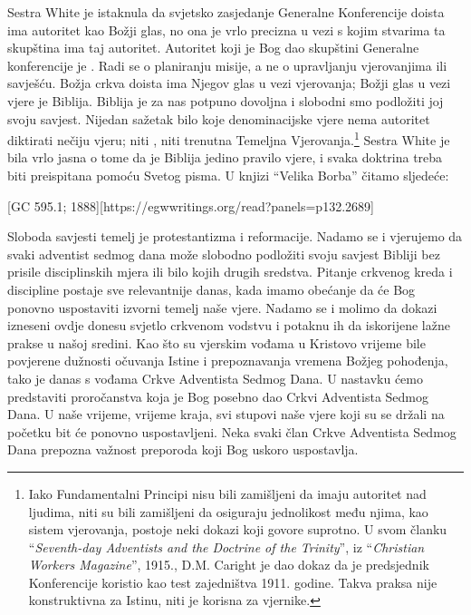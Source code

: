 Sestra White je istaknula da svjetsko zasjedanje Generalne Konferencije doista ima autoritet kao Božji glas, no ona je vrlo precizna u vezi s kojim stvarima ta skupština ima taj autoritet. Autoritet koji je Bog dao skupštini Generalne konferencije je . Radi se o planiranju misije, a ne o upravljanju vjerovanjima ili savješću. Božja crkva doista ima Njegov glas u vezi vjerovanja; Božji glas u vezi vjere je Biblija. Biblija je za nas potpuno dovoljna i slobodni smo podložiti joj svoju savjest. Nijedan sažetak bilo koje denominacijske vjere nema autoritet diktirati nečiju vjeru; niti , niti trenutna Temeljna Vjerovanja.\footnote{Iako Fundamentalni Principi nisu bili zamišljeni da imaju autoritet nad ljudima, niti su bili zamišljeni da osiguraju jednolikost među njima, kao sistem vjerovanja, postoje neki dokazi koji govore suprotno. U svom članku “\textit{Seventh-day Adventists and the Doctrine of the Trinity}”, iz “\textit{Christian Workers Magazine}”, 1915., D.M. Caright je dao dokaz da je predsjednik Konferencije koristio  kao test zajedništva 1911. godine. Takva praksa nije konstruktivna za Istinu, niti je korisna za vjernike.} Sestra White je bila vrlo jasna o tome da je Biblija jedino pravilo vjere, i svaka doktrina treba biti preispitana pomoću Svetog pisma. U knjizi “Velika Borba” čitamo sljedeće:

[GC 595.1; 1888][https://egwwritings.org/read?panels=p132.2689]

Sloboda savjesti temelj je protestantizma i reformacije. Nadamo se i vjerujemo da svaki adventist sedmog dana može slobodno podložiti svoju savjest Bibliji bez prisile disciplinskih mjera ili bilo kojih drugih sredstva. Pitanje crkvenog kreda i discipline postaje sve relevantnije danas, kada imamo obećanje da će Bog ponovno uspostaviti izvorni temelj naše vjere. Nadamo se i molimo da dokazi izneseni ovdje donesu svjetlo crkvenom vodstvu i potaknu ih da iskorijene lažne prakse u našoj sredini. Kao što su vjerskim vođama u Kristovo vrijeme bile povjerene dužnosti očuvanja Istine i prepoznavanja vremena Božjeg pohođenja, tako je danas s vođama Crkve Adventista Sedmog Dana. U nastavku ćemo predstaviti proročanstva koja je Bog posebno dao Crkvi Adventista Sedmog Dana. U naše vrijeme, vrijeme kraja, svi stupovi naše vjere koji su se držali na početku bit će ponovno uspostavljeni. Neka svaki član Crkve Adventista Sedmog Dana prepozna važnost preporoda koji Bog uskoro uspostavlja.


